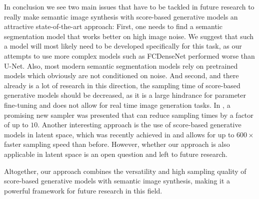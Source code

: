 In conclusion we see two main issues that have to be tackled in future research to really make semantic image synthesis with score-based generative models an attractive state-of-the-art approach: First, one needs to find a semantic segmentation model that works better on high image noise. We suggest that such a model will most likely need to be developed specifically for this task, as our attempts to use more complex models such as FCDenseNet \cite{densenet} performed worse than U-Net. Also, most modern semantic segmentation models rely on pretrained models which obviously are not conditioned on noise. And second, and there already is a lot of research in this direction, the sampling time of score-based generative models should be decreased, as it is a large hindrance for parameter fine-tuning and does not allow for real time image generation tasks. In \cite{gotta_go_fast}, a promising new sampler was presented that can reduce sampling times by a factor of up to $10$. Another interesting approach is the use of score-based generative models in latent space, which was recently achieved in \cite{latent} and allows for up to $600\times$ faster sampling speed than before. However, whether our approach is also applicable in latent space is an open question and left to future research.

Altogether, our approach combines the versatility and high sampling quality of score-based generative models with semantic image synthesis, making it a powerful framework for future research in this field.


